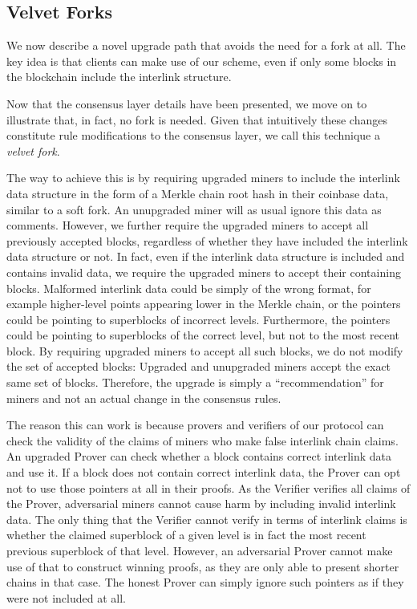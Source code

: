\subsection{Velvet Forks}
We now describe a novel upgrade path that avoids the need for a fork at all.
The key idea is that clients can make use of our scheme, even if only some blocks in the blockchain include the interlink structure.

Now that the consensus layer details have been presented, we move on to
illustrate that, in fact, no fork is needed. Given that intuitively these
changes constitute rule modifications to the consensus layer, we call this
technique a \textit{velvet fork}.

The way to achieve this is by requiring upgraded miners to include the
interlink data structure in the form of a Merkle chain root hash in their
coinbase data, similar to a soft fork. An unupgraded miner will as usual ignore
this data as comments. However, we further require the upgraded miners to
accept all previously accepted blocks, regardless of whether they have included
the interlink data structure or not. In fact, even if the interlink data
structure is included and contains invalid data, we require the upgraded miners
to accept their containing blocks. Malformed interlink data could be simply of
the wrong format, for example higher-level points appearing lower in the Merkle
chain, or the pointers could be pointing to superblocks of incorrect
levels. Furthermore, the pointers could be pointing to superblocks of the
correct level, but not to the most recent block. By requiring upgraded miners
to accept all such blocks, we do not modify the set of accepted blocks:
Upgraded and unupgraded miners accept the exact same set of blocks. Therefore,
the upgrade is simply a ``recommendation'' for miners and not an actual change in
the consensus rules.

The reason this can work is because provers and verifiers of our protocol can
check the validity of the claims of miners who make false interlink chain
claims. An upgraded Prover can check whether a block contains correct interlink
data and use it. If a block does not contain correct interlink data, the Prover
can opt not to use those pointers at all in their proofs. As the Verifier
verifies all claims of the Prover, adversarial miners cannot cause harm by
including invalid interlink data. The only thing that the Verifier cannot
verify in terms of interlink claims is whether the claimed superblock of a
given level is in fact the most recent previous superblock of that level.
However, an adversarial Prover cannot make use of that to construct winning
proofs, as they are only able to present shorter chains in that case. The
honest Prover can simply ignore such pointers as if they were not included at
all.

